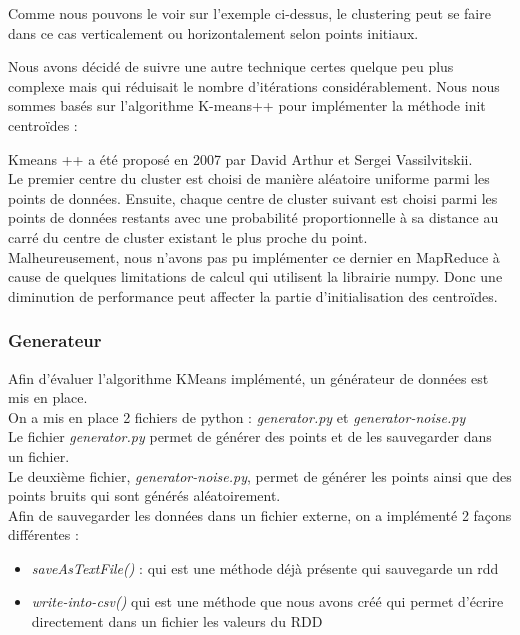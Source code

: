 \documentclass[french]{article}
\begin{document}
Comme nous pouvons le voir sur l’exemple ci-dessus, le clustering peut se faire dans ce cas verticalement ou horizontalement  selon points initiaux.

Nous avons décidé de suivre une autre technique certes quelque peu plus complexe mais qui réduisait le nombre d’itérations considérablement. Nous nous sommes basés sur l’algorithme K-means++ pour implémenter la méthode init centroïdes :

Kmeans ++ a été proposé en 2007 par David Arthur et Sergei Vassilvitskii.\\
Le premier centre du cluster est choisi de manière aléatoire uniforme parmi les points de données. Ensuite, chaque centre de cluster suivant est choisi parmi les points de données restants avec une probabilité proportionnelle à sa distance au carré du centre de cluster existant le plus proche du point.\\
Malheureusement, nous n’avons pas pu implémenter ce dernier en MapReduce à cause de quelques limitations de calcul qui utilisent la librairie numpy. Donc une diminution de performance peut affecter la partie d’initialisation des centroïdes.

\subsubsection{Generateur}
Afin d’évaluer l’algorithme KMeans implémenté, un générateur de données est mis en place. \\

On a mis en place 2 fichiers de python : \textit{generator.py} et \textit{generator-noise.py} \\
Le fichier \textit{generator.py} permet de générer des points et de les sauvegarder dans un fichier. \\
Le deuxième fichier, \textit{generator-noise.py}, permet de générer les points ainsi que des points bruits qui sont générés aléatoirement.\\

Afin de sauvegarder les données dans un fichier externe, on a implémenté 2 façons différentes :
\begin{itemize}
\item 	\textit{saveAsTextFile()} : qui est une méthode déjà présente qui sauvegarde un rdd
\item 	\textit{write-into-csv()} qui est une méthode que nous avons créé qui permet d'écrire directement dans un fichier les valeurs du RDD
\end{itemize}
\end{document}
